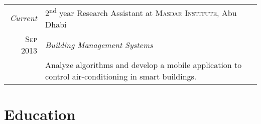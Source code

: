 \documentclass[a4paper,10pt]{article} %
\begin{document}
\begin{tabular}{r|p{11cm}}
\emph{Current} & 2\textsuperscript{nd} year Research Assistant at
\textsc{Masdar Institute}, Abu Dhabi \\ 
\textsc{Sep 2013} & \emph{Building Management Systems}\\ 
& \footnotesize{Analyze algorithms and develop a mobile
  application to control air-conditioning in smart buildings.}\\ 




\end{tabular}


\section{Education}
\end{document}
